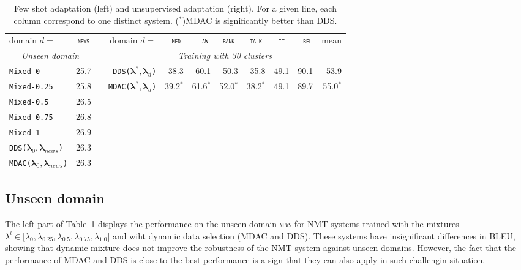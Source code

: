 \documentclass[11pt]{article}
\newcommand{\domain}[1]{\texttt{\textsc{#1}}}
\newcommand{\system}[1]{\texttt{{#1}}}
\newcommand{\vlambda}{\ensuremath{\boldsymbol\lambda}\xspace} %
\begin{document}
\begin{table}[htbp]
  \centering \small
  \begin{tabular}{|l|*{10}{r|}} \cline{1-2} \cline{4-11}
    domain \hfill $d=$ & \multicolumn{1}{c|}{\domain{news}}& \hfill &domain \hfill $d=$ & \multicolumn{1}{c|}{\domain{ med}} & \multicolumn{1}{c|}{\domain{ law}} & \multicolumn{1}{c|}{\domain{bank}} & \multicolumn{1}{c|}{\domain{talk}} & \multicolumn{1}{c|}{\domain{ it }} & \multicolumn{1}{c|}{\domain{ rel}} & \multicolumn{1}{c|}{mean}  \\ 
\cline{1-2} \cline{4-11}
    \multicolumn{2}{|c|}{\sl Unseen domain} & &\multicolumn{8}{c|}{\sl Training with 30 clusters} \\ 
\cline{1-2} \cline{4-11}
    \system{Mixed-0}      & 25.7 & &\system{DDS($\vlambda^*, \vlambda_d$)}&38.3&60.1&50.3&35.8&49.1&90.1&53.9\\
    \system{Mixed-0.25} & 25.8 & &\system{MDAC($\vlambda^*, \vlambda_d$)}&39.2$^*$&61.6$^*$&52.0$^*$&38.2$^*$&49.1&89.7&55.0$^*$\\ \cline{4-11}
    \system{Mixed-0.5}   &26.5\\
    \system{Mixed-0.75} &26.8\\
    \system{Mixed-1} &26.9 \\
    \cline{1-2}
     \system{DDS($\vlambda_0, \vlambda_{news}$)} &26.3 \\
     \system{MDAC($\vlambda_0, \vlambda_{news}$)} &26.3 \\
     \cline{1-2}
  \end{tabular}
  \caption{Few shot adaptation (left) and unsupervised adaptation (right). For a given line, each column correspond to one distinct system. ($^*$)MDAC is significantly better than DDS.}
  \label{tab:unsupervised-da}
\end{table}

\subsection{Unseen domain}\label{ssec:uda}
The left part of Table~\ref{tab:unsupervised-da} displays the performance on the unseen domain \domain{news} for NMT systems trained with the mixtures $\lambda^l \in \big[ \lambda_0, \lambda_{0.25}, \lambda_{0.5}, \lambda_{0.75}, \lambda_{1.0}\big]$ and wiht dynamic data selection (MDAC and DDS). These systems have insignificant differences in BLEU, showing that dynamic mixture does not improve the robustness of the NMT system against unseen domains. However, the fact that the performance of MDAC and DDS is close to the best performance is a sign that they can also apply in such challengin situation. %
\end{document}
